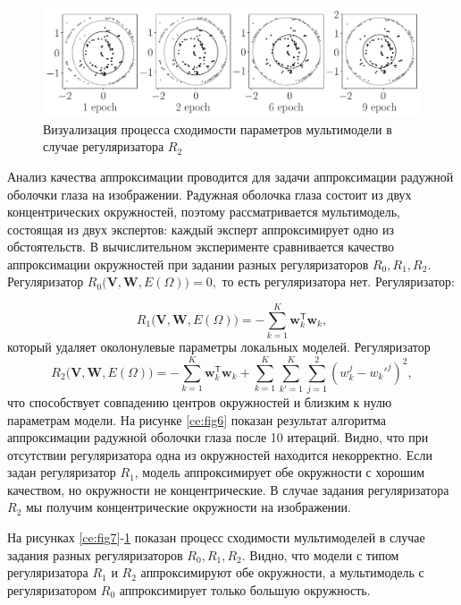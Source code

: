 \begin{figure}
\center
     \includegraphics[width=\textwidth]{results/priorexpertfig/experiment_real_regular}
     \caption{Визуализация процесса сходимости параметров мультимодели в случае регуляризатора $ R_2 $}
    \label{ce:fig9}
\end{figure}

Анализ качества аппроксимации проводится для задачи аппроксимации радужной оболочки глаза на изображении. Радужная оболочка глаза состоит из двух концентрических окружностей, поэтому рассматривается мультимодель, состоящая из двух экспертов: каждый эксперт аппроксимирует одно из обстоятельств. В вычислительном эксперименте сравнивается качество аппроксимации окружностей при задании разных регуляризаторов $ R_0, R_1, R_2 $. Регуляризатор $ R_0 \bigl(\mathbf{V}, \mathbf{W}, E(\Omega) \bigr) = 0, $ то есть регуляризатора нет. Регуляризатор:

\[
R_1\bigl(\mathbf{V}, \mathbf{W}, E(\Omega)\bigr)= -\sum_{k=1}^{K}\mathbf{w}_k^{\mathsf{T}}\mathbf{w}_k,
\]
который удаляет околонулевые параметры локальных моделей.
Регуляризатор
\[
R_2\bigl(\mathbf{V}, \mathbf{W}, E(\Omega)\bigr)= -\sum_{k=1}^{K}\mathbf{w}_k^{\mathsf{T}}\mathbf{w}_k + \sum_{k=1}^{K}\sum_{k'=1}^{K}\sum_{j=1}^2\left(w_k^j-w_k'^j\right)^2,
\]
что способствует совпадению центров окружностей и близким к нулю параметрам модели.
На рисунке \ref{ce:fig6} показан результат алгоритма аппроксимации радужной оболочки глаза после 10 итераций. Видно, что при отсутствии регуляризатора одна из окружностей находится некорректно. Если задан регуляризатор $ R_1 $, модель аппроксимирует обе окружности с хорошим качеством, но окружности не концентрические. В случае задания регуляризатора $ R_2 $ мы получим концентрические окружности на изображении.

На рисунках \ref{ce:fig7}-\ref{ce:fig9} показан процесс сходимости мультимоделей в случае задания разных регуляризаторов $ R_0, R_1, R_2 $. Видно, что модели с типом регуляризатора $ R_1 $ и $ R_2 $ аппроксимируют обе окружности, а мультимодель с регуляризатором $ R_0 $ аппроксимирует только большую окружность.
